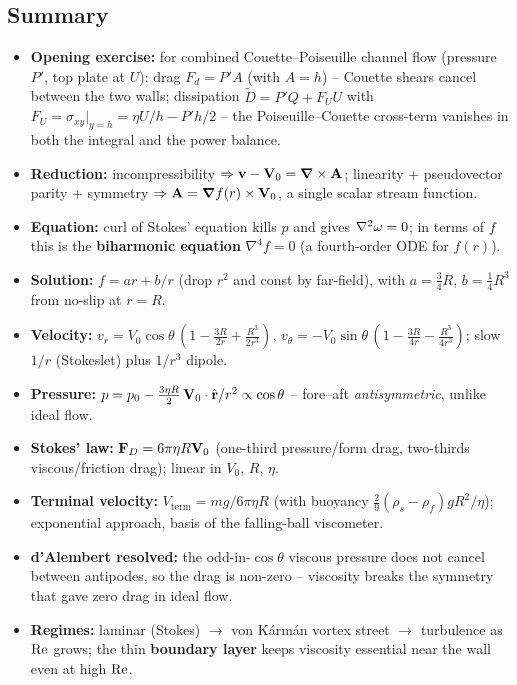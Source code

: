 \documentclass[../main.tex]{subfiles}
\begin{document}
\subsection*{Summary}
\begin{itemize}
  \item \textbf{Opening exercise:} for combined Couette--Poiseuille channel flow (pressure $P'$, top plate at $U$): drag $F_d=P'A$ (with $A=h$) -- Couette shears cancel between the two walls; dissipation $\tilde{D}=P'Q+F_U U$ with $F_U=\sigma_{xy}|_{y=h}=\eta U/h-P'h/2$ -- the Poiseuille--Couette cross-term vanishes in both the integral and the power balance.
  \item \textbf{Reduction:} incompressibility $\Rightarrow\mathbf{v}-\mathbf{V}_0=\grad\times\mathbf{A}$; linearity + pseudovector parity + symmetry $\Rightarrow\mathbf{A}=\grad f(r)\times\mathbf{V}_0$, a single scalar stream function.
  \item \textbf{Equation:} curl of Stokes' equation kills $p$ and gives $\nabla^2\mathbf{\omega}=0$; in terms of $f$ this is the \textbf{biharmonic equation} $\nabla^4 f=0$ (a fourth-order ODE for $f(r)$).
  \item \textbf{Solution:} $f=ar+b/r$ (drop $r^2$ and const by far-field), with $a=\tfrac34 R$, $b=\tfrac14 R^3$ from no-slip at $r=R$.
  \item \textbf{Velocity:} $v_r=V_0\cos\theta\,(1-\tfrac{3R}{2r}+\tfrac{R^3}{2r^3})$, $v_\theta=-V_0\sin\theta\,(1-\tfrac{3R}{4r}-\tfrac{R^3}{4r^3})$; slow $1/r$ (Stokeslet) plus $1/r^3$ dipole.
  \item \textbf{Pressure:} $p=p_0-\tfrac{3\eta R}{2}\,\mathbf{V}_0\cdot\hat{\mathbf{r}}/r^2\propto\cos\theta$ -- fore--aft \emph{antisymmetric}, unlike ideal flow.
  \item \textbf{Stokes' law:} $\mathbf{F}_D=6\pi\eta R\mathbf{V}_0$ (one-third pressure/form drag, two-thirds viscous/friction drag); linear in $V_0$, $R$, $\eta$.
  \item \textbf{Terminal velocity:} $V_{\text{term}}=mg/6\pi\eta R$ (with buoyancy $\tfrac29(\rho_s-\rho_f)gR^2/\eta$); exponential approach, basis of the falling-ball viscometer.
  \item \textbf{d'Alembert resolved:} the odd-in-$\cos\theta$ viscous pressure does not cancel between antipodes, so the drag is non-zero -- viscosity breaks the symmetry that gave zero drag in ideal flow.
  \item \textbf{Regimes:} laminar (Stokes) $\to$ von Kármán vortex street $\to$ turbulence as $\mathrm{Re}$ grows; the thin \textbf{boundary layer} keeps viscosity essential near the wall even at high $\mathrm{Re}$.
\end{itemize}
\end{document}
